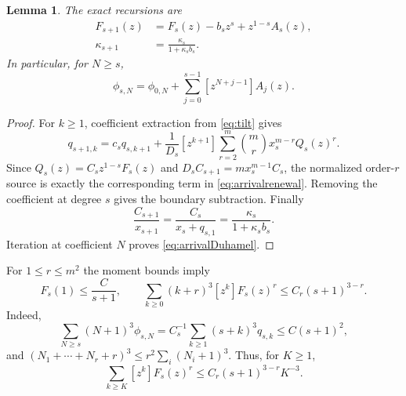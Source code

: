 \documentclass[11pt,letterpaper,reqno]{amsart}
\theoremstyle{plain}
\newtheorem{lemma}[theorem]{Lemma}
\begin{document}
\begin{lemma}\label{lem:arrival}
The exact recursions are
\begin{align}
 F_{s+1}(z)&=F_s(z)-b_sz^s+z^{1-s}A_s(z),\label{eq:arrivalrenewal}\\
 \kappa_{s+1}&=\frac{\kappa_s}{1+\kappa_sb_s}.\label{eq:kappa}
\end{align}
In particular, for $N\ge s$,
\begin{equation}\label{eq:arrivalDuhamel}
 \phi_{s,N}=\phi_{0,N}+\sum_{j=0}^{s-1}[z^{N+j-1}]A_j(z).
\end{equation}
\end{lemma}
\begin{proof}
For $k\ge1$, coefficient extraction from \eqref{eq:tilt} gives
\[
 q_{s+1,k}=c_sq_{s,k+1}+
 \frac1{D_s}[z^{k+1}]\sum_{r=2}^m\binom mr x_s^{m-r}Q_s(z)^r.
\]
Since $Q_s(z)=C_sz^{1-s}F_s(z)$ and $D_sC_{s+1}=mx_s^{m-1}C_s$, the normalized order-$r$ source is exactly the corresponding term in \eqref{eq:arrivalrenewal}. Removing the coefficient at degree $s$ gives the boundary subtraction. Finally
\[
 \frac{C_{s+1}}{x_{s+1}}=\frac{C_s}{x_s+q_{s,1}}
 =\frac{\kappa_s}{1+\kappa_sb_s}.
\]
Iteration at coefficient $N$ proves \eqref{eq:arrivalDuhamel}.
\end{proof}

For $1\le r\le m^2$ the moment bounds imply
\begin{equation}\label{eq:Fmoment}
 F_s(1)\le\frac C{s+1},\qquad
 \sum_{k\ge0}(k+r)^3[z^k]F_s(z)^r\le C_r(s+1)^{3-r}.
\end{equation}
Indeed,
\[
 \sum_{N\ge s}(N+1)^3\phi_{s,N}
 =C_s^{-1}\sum_{k\ge1}(s+k)^3q_{s,k}\le C(s+1)^2,
\]
and $(N_1+\cdots+N_r+r)^3\le r^2\sum_i(N_i+1)^3$. Thus, for $K\ge1$,
\begin{equation}\label{eq:Ftail}
 \sum_{k\ge K}[z^k]F_s(z)^r\le C_r(s+1)^{3-r}K^{-3}.
\end{equation}
\end{document}
